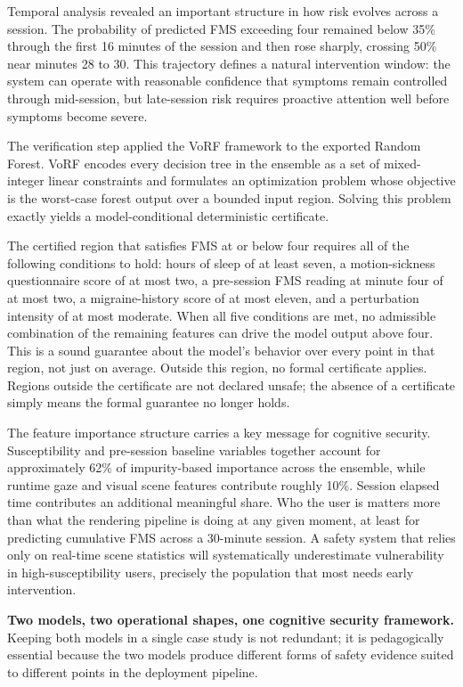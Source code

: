 \documentclass[graybox]{svmult}
\begin{document}
Temporal analysis revealed an important structure in how risk evolves across a session. The probability of predicted FMS exceeding four remained below 35\% through the first 16 minutes of the session and then rose sharply, crossing 50\% near minutes 28 to 30. This trajectory defines a natural intervention window: the system can operate with reasonable confidence that symptoms remain controlled through mid-session, but late-session risk requires proactive attention well before symptoms become severe.

The verification step applied the VoRF framework \citep{tornblom2019vorf} to the exported Random Forest. VoRF encodes every decision tree in the ensemble as a set of mixed-integer linear constraints and formulates an optimization problem whose objective is the worst-case forest output over a bounded input region. Solving this problem exactly yields a model-conditional deterministic certificate.

The certified region that satisfies FMS at or below four requires all of the following conditions to hold: hours of sleep of at least seven, a motion-sickness questionnaire score of at most two, a pre-session FMS reading at minute four of at most two, a migraine-history score of at most eleven, and a perturbation intensity of at most moderate. When all five conditions are met, no admissible combination of the remaining features can drive the model output above four. This is a sound guarantee about the model's behavior over every point in that region, not just on average. Outside this region, no formal certificate applies. Regions outside the certificate are not declared unsafe; the absence of a certificate simply means the formal guarantee no longer holds.

The feature importance structure carries a key message for cognitive security. Susceptibility and pre-session baseline variables together account for approximately 62\% of impurity-based importance across the ensemble, while runtime gaze and visual scene features contribute roughly 10\%. Session elapsed time contributes an additional meaningful share. Who the user is matters more than what the rendering pipeline is doing at any given moment, at least for predicting cumulative FMS across a 30-minute session. A safety system that relies only on real-time scene statistics will systematically underestimate vulnerability in high-susceptibility users, precisely the population that most needs early intervention.

\textbf{Two models, two operational shapes, one cognitive security framework.}
Keeping both models in a single case study is not redundant; it is pedagogically essential because the two models produce different forms of safety evidence suited to different points in the deployment pipeline.
\end{document}
